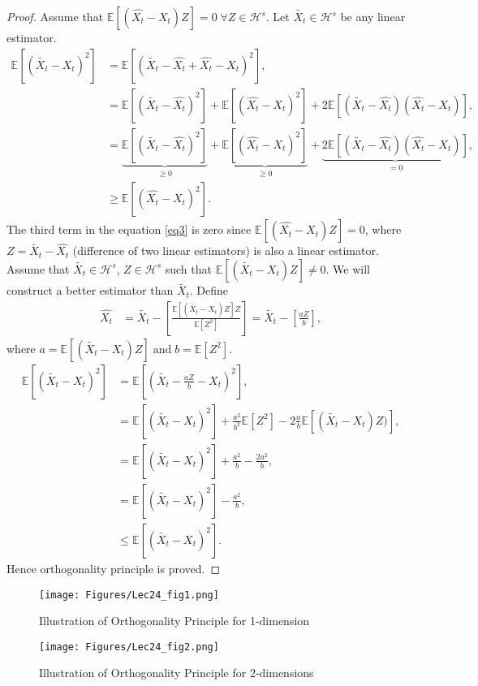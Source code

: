 \documentclass[a4paper,english,12pt]{article}
\begin{document}
\begin{proof}
Assume that $\mathbb{E}[(\hat{X_t}-X_t)Z]=0 \; \forall Z \in \mathcal{H}^s$.
Let $\tilde{X_t}\in \mathcal{H}^s$ be any linear estimator.
\begin{align}
\mathbb{E}[(\tilde{X_t}-X_t)^2]&=\mathbb{E}[(\tilde{X_t}-\hat{X_t}+\hat{X_t}-X_t)^2],
\nonumber\\
&=\mathbb{E}[(\tilde{X_t}-\hat{X_t})^2]+\mathbb{E}[(\hat{X_t}-X_t)^2]+2\mathbb{E}[(\tilde{X_t}-\hat{X_t})(\hat{X_t}-X_t)],
\nonumber\\
&=\underbrace{\mathbb{E}[(\tilde{X_t}-\hat{X_t})^2]}_{\geqslant0}+\underbrace{\mathbb{E}[(\hat{X_t}-X_t)^2]}_{\geqslant0}+ \underbrace{2\mathbb{E}[(\tilde{X_t}-\hat{X_t})(\hat{X_t}-X_t)]}_{=0} \label{eq3},\\
&\geq \mathbb{E}[(\hat{X_t}-X_t)^2].
\nonumber
\end{align}
The third term in the equation \eqref{eq3} is zero since $\mathbb{E}[(\hat{X_t}-X_t)Z]=0$, where $Z=\tilde{X_t}-\hat{X_t}$ (difference of two linear estimators) is also a linear estimator. Assume that $\tilde{X_t}\in \mathcal{H}^s$, $Z \in \mathcal{H}^s$ such that $\mathbb{E}[(\tilde{X_t}-X_t)Z]\neq0$.
We will construct a better estimator than $\tilde{X_t}$. Define
\begin{align}
\nonumber
\hat{X_t}&=\tilde{X_t}-\left[\frac{\mathbb{E}[(\tilde{X_t}-X_t)Z]Z}{\mathbb{E}[Z^2]}\right]=\tilde{X_t}-\left[\frac{aZ}{b}\right] ,
\end{align}
where $a=\mathbb{E}[(\tilde{X_t}-X_t)Z] \; \text {and} \; b=\mathbb{E}[Z^2]$.
\begin{align}
\mathbb{E}[(\tilde{X_t}-X_t)^2]&=\mathbb{E}[(\tilde{X_t}-\frac{aZ}{b}-X_t)^2],\nonumber\\
&=\mathbb{E}[(\tilde{X_t}-X_t)^2]+\frac{a^2}{b^2}\mathbb{E}[Z^2]-2\frac{a}{b}\mathbb{E}[(\tilde{X_t}-X_t)Z)],\nonumber\\
&=\mathbb{E}[(\tilde{X_t}-X_t)^2]+\frac{a^2}{b}-\frac{2a^2}{b},\nonumber\\
&=\mathbb{E}[(\tilde{X_t}-X_t)^2]-\frac{a^2}{b}\nonumber,\\
&\leq \mathbb{E}[(\tilde{X_t}-X_t)^2].
\nonumber
\end{align}
Hence orthogonality principle is proved.
\end{proof}
\begin{figure}
\centering
\texttt{[image: Figures/Lec24\_fig1.png]}
\caption{Illustration of Orthogonality Principle for 1-dimension}\label{fig:fig1}
\texttt{[image: Figures/Lec24\_fig2.png]}
\caption{Illustration of Orthogonality Principle for 2-dimensions}\label{fig:fig2}
\end{figure}
\end{document}
